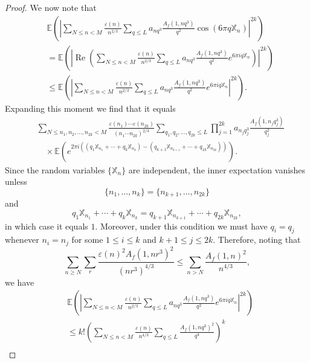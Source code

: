 \documentclass[10pt,leqno]{amsart}
\numberwithin{equation}{section}
\begin{document}
\begin{proof}
 We now note that
\[
\begin{aligned}
& \mathbb{E}\left(\left|\sum_{N \leqslant n<M} \frac{\varepsilon(n)}{n^{2 / 3}} \sum_{q \leqslant L} a_{n q^3} \frac{A_f\left(1,n q^3\right)}{q^{2}} \cos \left(6 \pi q \mathbb{X}_n\right)\right|^{2 k}\right) \\
& =\mathbb{E}\left(\left|\operatorname{Re}\left( \sum_{N \leqslant n<M} \frac{\varepsilon(n)}{n^{2 / 3}} \sum_{q \leqslant L} a_{n q^3} \frac{A_f\left(1,n q^3\right)}{q^{ 2}} e^{6 \pi i q \mathbb{X}_n}\right)\right|^{2k}\right) \\
& \leqslant \mathbb{E}\left(\left|\sum_{N \leqslant n<M} \frac{\varepsilon(n)}{n^{2 / 3}} \sum_{q \leqslant L} a_{n q^3} \frac{A_f\left(1,n q^3\right)}{q^{ 2}} e^{6 \pi i q \mathbb{X}_n}\right|^{2 k}\right) .
\end{aligned}
\]
Expanding this moment we find that it equals
\[
\begin{aligned}
& \sum_{N \leqslant n_1, n_2, \ldots, n_{2 k}<M} \frac{\varepsilon\left(n_1\right) \cdots 
\varepsilon\left(n_{2 k}\right)}{\left(n_1 \cdots n_{2 k}\right)^{2 / 3}} \sum_{q_1, q_2, \ldots, q_{2 k} \leqslant L} \prod_{j=1}^{2 k} a_{n_j q_j^3} \frac{A_f\left(1,n_j q_j^3\right)}{q_j^{2}} \\
& \quad \times \mathbb{E}\left(e^{2 \pi i\left(\left(q_1 \mathbb{X}_{n_1}+\cdots+q_{k} \mathbb{X}_{n_{k}}\right)-\left(q_{k+1} \mathbb{X}_{n_{k+1}}+\cdots+q_{1k} \mathbb{X}_{n_{2k}}\right)\right)}\right).
\end{aligned}
\]
Since the random variables $\{\mathbb{X}_n\}$ are independent, the inner expectation vanishes unless
\[
\{n_1,\dots,n_k\}=\{n_{k+1},\dots,n_{2k}\}
\] 
and
\[
q_1\mathbb{X}_{n_1}+\cdots+q_k\mathbb{X}_{n_k}=q_{k+1}\mathbb{X}_{n_{k+1}}+\cdots+q_{2k}\mathbb{X}_{n_{2k}},
\]
in which case it equals $1$. Moreover, under this condition we must have $q_i = q_j$ whenever $n_i = n_j$ for some $1 \le i \le k$ and $k+1 \le j \le 2k$. Therefore, noting that 
\[
\sum_{n\geqslant N} \sum_{r}\frac{\varepsilon (n)^2 A_f(1,nr^3)^2}{\left(nr^3\right)^{4/3}}\leqslant \sum_{n>N}\frac{A_f(1,n)^2}{n^{4/3}},
\]
we have
\[
\begin{aligned}
&\mathbb{E}\left(\left|\sum_{N \leqslant n<M} \frac{\varepsilon(n)}{n^{2/ 3}} \sum_{q \leqslant L} a_{n q^3} \frac{A_f\left(1,n q^3\right)}{q^{ 2}} e^{ 6\pi i q \mathbb{X}_n}\right|^{2 k}\right)\\
& \leqslant k!\left(\sum_{N \leqslant n<M} \frac{\varepsilon(n)}{n^{4/3}} \sum_{q \leqslant L} \frac{A_f\left(1,n q^3\right)^2}{q^4}\right)^k   \\

\end{aligned}\]
\end{proof}
\end{document}
